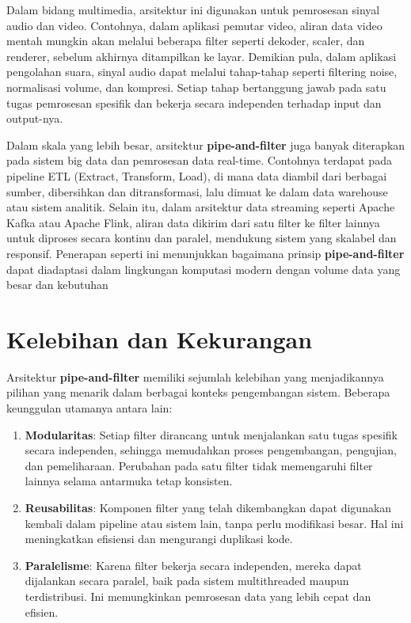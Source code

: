 Dalam bidang multimedia, arsitektur ini digunakan untuk pemrosesan sinyal audio dan video. Contohnya, dalam aplikasi pemutar video, aliran data video mentah mungkin akan melalui beberapa filter seperti dekoder, scaler, dan renderer, sebelum akhirnya ditampilkan ke layar. Demikian pula, dalam aplikasi pengolahan suara, sinyal audio dapat melalui tahap-tahap seperti filtering noise, normalisasi volume, dan kompresi. Setiap tahap bertanggung jawab pada satu tugas pemrosesan spesifik dan bekerja secara independen terhadap input dan output-nya.

Dalam skala yang lebih besar, arsitektur \textbf{pipe-and-filter} juga banyak diterapkan pada sistem big data dan pemrosesan data real-time. Contohnya terdapat pada pipeline ETL (Extract, Transform, Load), di mana data diambil dari berbagai sumber, dibersihkan dan ditransformasi, lalu dimuat ke dalam data warehouse atau sistem analitik. Selain itu, dalam arsitektur data streaming seperti Apache Kafka atau Apache Flink, aliran data dikirim dari satu filter ke filter lainnya untuk diproses secara kontinu dan paralel, mendukung sistem yang skalabel dan responsif. Penerapan seperti ini menunjukkan bagaimana prinsip \textbf{pipe-and-filter} dapat diadaptasi dalam lingkungan komputasi modern dengan volume data yang besar dan kebutuhan


\section{Kelebihan dan Kekurangan}

Arsitektur \textbf{pipe-and-filter} memiliki sejumlah kelebihan yang menjadikannya pilihan yang menarik dalam berbagai konteks pengembangan sistem. Beberapa keunggulan utamanya antara lain:

\begin{enumerate}
	\item \textbf{Modularitas}: Setiap filter dirancang untuk menjalankan satu tugas spesifik secara independen, sehingga memudahkan proses pengembangan, pengujian, dan pemeliharaan. Perubahan pada satu filter tidak memengaruhi filter lainnya selama antarmuka tetap konsisten.
	
	\item \textbf{Reusabilitas}: Komponen filter yang telah dikembangkan dapat digunakan kembali dalam pipeline atau sistem lain, tanpa perlu modifikasi besar. Hal ini meningkatkan efisiensi dan mengurangi duplikasi kode.
	
	\item \textbf{Paralelisme}: Karena filter bekerja secara independen, mereka dapat dijalankan secara paralel, baik pada sistem multithreaded maupun terdistribusi. Ini memungkinkan pemrosesan data yang lebih cepat dan efisien.
\end{enumerate}

